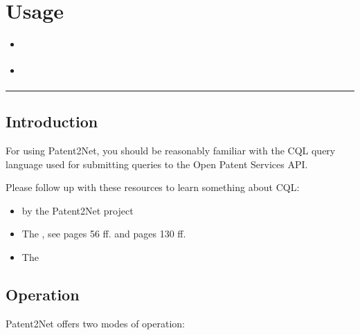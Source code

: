 \documentclass[letterpaper,10pt,english]{sphinxmanual}
\begin{document}
\section{Usage}
\label{\detokenize{usage/index:usage}}\label{\detokenize{usage/index:id1}}\label{\detokenize{usage/index::doc}}
\begin{sphinxShadowBox}
\begin{itemize}
\item {} 
\label{\detokenize{usage/index:id2}}{\hyperref[\detokenize{usage/index:introduction}]{}}

\item {} 
\label{\detokenize{usage/index:id3}}{\hyperref[\detokenize{usage/index:operation}]{}}

\end{itemize}
\end{sphinxShadowBox}


\bigskip\hrule\bigskip



\subsection{Introduction}
\label{\detokenize{usage/index:introduction}}
For using Patent2Net, you should be reasonably familiar with the CQL query language
used for submitting queries to the Open Patent Services API.

Please follow up with these resources to learn something about CQL:
\begin{itemize}
\item {} 
 by the Patent2Net project

\item {} 
The , see pages 56 ff. and pages 130 ff.

\item {} 
The 

\end{itemize}


\subsection{Operation}
\label{\detokenize{usage/index:operation}}
Patent2Net offers two modes of operation:
\end{document}
